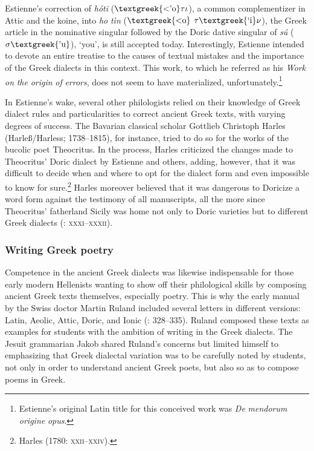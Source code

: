 Estienne’s correction of \textit{hóti} ($\text{\textgreek{<'o}}\tau \iota $), a common complementizer in Attic and the koine, into \textit{ho} \textit{tìn} ($\text{\textgreek{<o}}$ $\tau \text{\textgreek{`i}}\nu $), the Greek article in the nominative singular followed by the Doric dative singular of \textit{sú} ($\sigma \text{\textgreek{'u}}$), ‘you’, is still accepted today. Interestingly, Estienne intended to devote an entire treatise to the causes of textual mistakes and the importance of the Greek dialects in this context. This work, to which he referred as his \textit{Work} \textit{on} \textit{the} \textit{origin} \textit{of} \textit{errors}, does not seem to have materialized, unfortunately.\footnote{Estienne’s original Latin title for this conceived work was \textit{De} \textit{mendorum} \textit{origine} \textit{opus}.}

In Estienne’s wake, several other philologists relied on their knowledge of Greek dialect rules and particularities to correct ancient Greek texts, with varying degrees of success. The Bavarian classical scholar Gottlieb Christoph Harles (Harleß/Harless; 1738–1815), for instance, tried to do so for the works of the bucolic poet Theocritus. In the process, Harles criticized the changes made to Theocritus’ Doric dialect by Estienne and others, adding, however, that it was difficult to decide when and where to opt for the dialect form and even impossible to know for sure.\footnote{Harles (1780: \textsc{xxii–xxiv}).} Harles moreover believed that it was dangerous to Doricize a word form against the testimony of all manuscripts, all the more since Theocritus’ fatherland Sicily was home not only to Doric varieties but to different Greek dialects (\citealt{Harles1780}: \textsc{xxxi–xxxii}).

\subsubsection{Writing Greek poetry}
\hypertarget{Toc19704823}{}
Competence in the ancient Greek dialects was likewise indispensable for those early modern Hellenists wanting to show off their philological skills by composing ancient Greek texts themselves, especially poetry. This is why the early manual by the Swiss doctor Martin Ruland included several letters in different versions: Latin, Aeolic, Attic, Doric, and Ionic (\citealt{Ruland1556}: 328–335). Ruland composed these texts as examples for students with the ambition of writing in the Greek dialects. The Jesuit grammarian Jakob \citet[35]{Gretser1593} shared Ruland’s concerns but limited himself to emphasizing that Greek dialectal variation was to be carefully noted by students, not only in order to understand ancient Greek poets, but also so as to compose poems in Greek.

